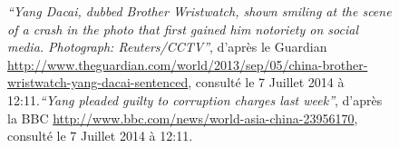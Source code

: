 \begin{figure}[ht]
    \centering
    \caption{      
            \textit{``Yang Dacai, dubbed Brother Wristwatch, shown smiling at the scene of a crash in the photo that first gained him notoriety on social media. Photograph: Reuters/CCTV''}, d'après le Guardian \url{http://www.theguardian.com/world/2013/sep/05/china-brother-wristwatch-yang-dacai-sentenced}, consulté le 7 Juillet 2014 à 12:11.\textit{``Yang pleaded guilty to corruption charges last week''}, d'après la BBC \url{http://www.bbc.com/news/world-asia-china-23956170}, consulté le 7 Juillet 2014 à 12:11.
    }
\end{figure}


